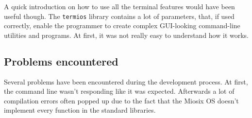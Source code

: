 \documentclass[10pt]{article}
\begin{document}
A quick introduction on how to use all the terminal features would have been useful though. The \verb|termios| library contains a lot of parameters, that, if used correctly, enable the programmer to create complex GUI-looking command-line utilities and programs. At first, it was not really easy to understand how it works.

\subsection{Problems encountered}
Several problems have been encountered during the development process. At first, the command line wasn't responding like it was expected. Afterwards a lot of compilation errors often popped up due to the fact that the Miosix OS doesn't implement every function in the standard libraries. 
\end{document}

